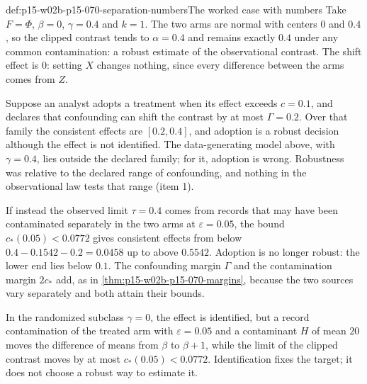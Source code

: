 \begin{hbexample}{def:p15-w02b-p15-070-separation-numbers}{The worked case with numbers}
Take \(F=\Phi\), \(\beta=0\), \(\gamma=0.4\) and \(k=1\). The two arms
are normal with centers \(0\) and \(0.4\), so the clipped contrast tends
to \(\alpha=0.4\) and remains exactly \(0.4\) under any common
contamination: a robust estimate of the observational contrast. The shift
effect is \(0\): setting \(X\) changes nothing, since every difference
between the arms comes from \(Z\).

Suppose an analyst adopts a treatment when its effect exceeds \(c=0.1\),
and declares that confounding can shift the contrast by at most
\(\Gamma=0.2\). Over that family the consistent effects are
\([0.2,0.4]\), and adoption is a robust decision although the effect is
not identified. The data-generating model above, with \(\gamma=0.4\),
lies outside the declared family; for it, adoption is wrong.
Robustness was relative to the declared range of confounding, and
nothing in the observational law tests that range (item 1).

If instead the observed limit \(\tau=0.4\) comes from records that may
have been contaminated separately in the two arms at
\(\varepsilon=0.05\), the bound \(c_*(0.05)<0.0772\) gives consistent
effects from below \(0.4-0.1542-0.2=0.0458\) up to above \(0.5542\).
Adoption is no longer robust: the lower end lies below \(0.1\). The
confounding margin \(\Gamma\) and the contamination margin \(2c_*\) add,
as in \cref{thm:p15-w02b-p15-070-margins}, because the two sources vary
separately and both attain their bounds.

In the randomized subclass \(\gamma=0\), the effect is identified, but a
record contamination of the treated arm with \(\varepsilon=0.05\) and a
contaminant \(H\) of mean \(20\) moves the difference of means from
\(\beta\) to \(\beta+1\), while the limit of the clipped contrast moves by
at most \(c_*(0.05)<0.0772\). Identification fixes the target; it does not choose a robust
way to estimate it.
\end{hbexample}

